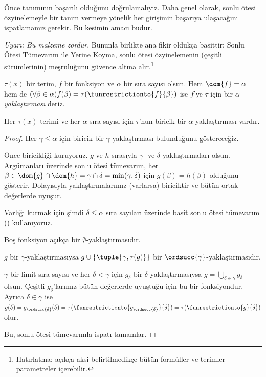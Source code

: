 \documentclass[../../../include/open-logic-section]{subfiles}
\begin{document}

Önce  tanımının başarılı olduğunu
doğrulamalıyız. Daha genel olarak, sonlu ötesi özyinelemeyle bir tanım
vermeye yönelik her girişimin başarıya ulaşacağını ispatlamamız gerekir.
Bu kesimin amacı budur.

\emph{Uyarı: Bu malzeme zordur}. Bununla birlikte ana fikir oldukça
basittir: Sonlu Ötesi Tümevarım ile Yerine Koyma, sonlu ötesi özyinelemenin
(çeşitli sürümlerinin) meşruluğunu güvence altına alır.\footnote{Hatırlatma:
açıkça aksi belirtilmedikçe bütün formüller ve terimler parametreler
içerebilir.}

\begin{defn}
	$\tau(x)$ bir terim, $f$ bir fonksiyon ve $\alpha$ bir sıra sayısı olsun.
	Hem $\dom{f}=\alpha$ hem de
	$(\forall\beta\in\alpha)f(\beta)=
	\tau(\funrestrictionto{f}{\beta})$ ise $f$'ye $\tau$ için bir
	\emph{$\alpha$-yaklaştırması} deriz.
\end{defn}

\begin{lem}
Her $\tau(x)$ terimi ve her $\alpha$ sıra sayısı için $\tau$'nun biricik bir
$\alpha$-yaklaştırması vardır.
\end{lem}
\begin{proof}
Her $\gamma\leq\alpha$ için biricik bir $\gamma$-yaklaştırması bulunduğunu
göstereceğiz.

Önce biricikliği kuruyoruz. $g$ ve $h$ sırasıyla $\gamma$- ve
$\delta$-yaklaştırmaları olsun. Argümanları üzerinde sonlu ötesi tümevarım,
her $\beta\in\dom{g}\cap\dom{h}=\gamma\cap\delta=
\min(\gamma,\delta)$ için $g(\beta)=h(\beta)$ olduğunu gösterir. Dolayısıyla
yaklaştırmalarımız (varlarsa) biriciktir ve bütün ortak değerlerde uyuşur.

Varlığı kurmak için şimdi $\delta\leq\alpha$ sıra sayıları üzerinde basit
sonlu ötesi tümevarım ()
kullanıyoruz.

Boş fonksiyon açıkça bir $\emptyset$-yaklaştırmasıdır.

$g$ bir $\gamma$-yaklaştırmasıysa
$g\cup\{\tuple{\gamma,\tau(g)}\}$ bir
$\ordsucc{\gamma}$-yaklaştırmasıdır.

$\gamma$ bir limit sıra sayısı ve her $\delta<\gamma$ için $g_\delta$ bir
$\delta$-yaklaştırmasıysa
$g=\bigcup_{\delta\in\gamma}g_\delta$ olsun. Çeşitli $g_\delta$'larımız
bütün değerlerde uyuştuğu için bu bir fonksiyondur. Ayrıca
$\delta\in\gamma$ ise
$g(\delta)=g_{\ordsucc{\delta}}(\delta)=
\tau(\funrestrictionto{g_{\ordsucc{\delta}}}{\delta})=
\tau(\funrestrictionto{g}{\delta})$ olur.

Bu, sonlu ötesi tümevarımla ispatı tamamlar.
\end{proof}
\end{document}
